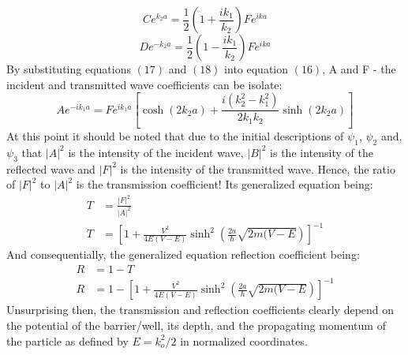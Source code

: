 \documentclass[twocolumn]{article}
\begin{document}
\begin{equation}
	Ce^{k_2a}=\frac{1}{2}\left(1+\frac{ik_1}{k_2}\right)Fe^{ika}
\end{equation}
\begin{equation}
	De^{-k_2a}=\frac{1}{2}\left(1-\frac{ik_1}{k_2}\right)Fe^{ika}
\end{equation}
By substituting equations $(17)$ and $(18)$ into equation $(16)$, A and F - the incident and transmitted wave coefficients can be isolate:
\begin{equation}
	Ae^{-ik_1a}=Fe^{ik_1a}\left[\cosh(2k_2a)+\frac{i(k_2^2-k_1^2)}{2k_1k_2}\sinh(2k_2a)\right]
\end{equation}
At this point it should be noted that due to the initial descriptions of $\psi_1$, $\psi_2$ and, $\psi_3$ that $|A|^2$ is the intensity of the incident wave, $|B|^2$ is the intensity of the reflected wave and $|F|^2$ is the intensity of the transmitted wave. Hence, the ratio of $|F|^2$ to $|A|^2$ is the transmission coefficient! Its generalized equation being:
\begin{align}
	T&=\frac{|F|^2}{|A|^2} \\
	T&=\left[1+\frac{V^2}{4E(V-E)}\sinh^2\left(\frac{2a}{\hbar}\sqrt{2m(V-E}\right)\right]^{-1}
\end{align}
And consequentially, the generalized equation reflection coefficient being:
\begin{align}
	R&=1-T \\
	R&=1-\left[1+\frac{V^2}{4E(V-E)}\sinh^2\left(\frac{2a}{\hbar}\sqrt{2m(V-E}\right)\right]^{-1}
\end{align}
Unsurprising then, the transmission and reflection coefficients clearly depend on the potential of the barrier/well, its depth, and the propagating momentum of the particle as defined by $E=k_o^2/2$ in normalized coordinates. 
\end{document}
